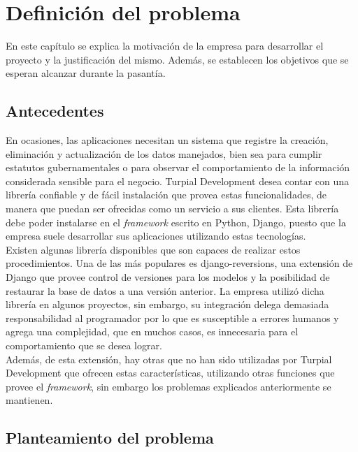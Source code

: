 \chapter{\textbf{Definición del problema}}

\thispagestyle{empty}

En este capítulo se explica la motivación de la empresa para desarrollar el proyecto y la justificación del mismo. Además, se establecen los objetivos que se esperan alcanzar durante la pasantía.

\section{Antecedentes}

En ocasiones, las aplicaciones necesitan un sistema que registre la creación, eliminación y actualización de los datos manejados, bien sea para cumplir estatutos gubernamentales o para observar el comportamiento de la información considerada sensible para el negocio. Turpial Development desea contar con una librería confiable y de fácil instalación que provea estas funcionalidades, de manera que puedan ser ofrecidas como un servicio a sus clientes. Esta librería debe poder instalarse en el \textit{framework} escrito en Python, Django, puesto que la empresa suele desarrollar sus aplicaciones utilizando estas tecnologías. \\

Existen algunas librería disponibles que son capaces de realizar estos procedimientos. Una de las más populares es django-reversions, una extensión de Django que provee control de versiones para los modelos y la posibilidad de restaurar la base de datos a una versión anterior. La empresa utilizó dicha librería en algunos proyectos, sin embargo, su integración delega demasiada responsabilidad al programador por lo que es susceptible a errores humanos y agrega una complejidad, que en muchos casos, es innecesaria para el comportamiento que se desea lograr. \\

Además, de esta extensión, hay otras que no han sido utilizadas por Turpial Development que ofrecen estas características, utilizando otras funciones que provee el \textit{framework}, sin embargo los problemas explicados anteriormente se mantienen.


\section{Planteamiento del problema}


